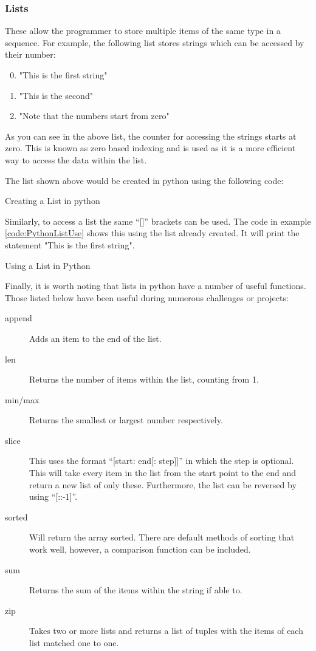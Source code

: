 			\subsubsection{Lists}
				These allow the programmer to store multiple items of the same type in a sequence.
				For example, the following list stores strings which can be accessed by their number:
				\begin{enumerate}\setcounter{enumi}{-1} %
					\item "This is the first string"
					\item "This is the second"
					\item "Note that the numbers start from zero"
				\end{enumerate}
				As you can see in the above list, the counter for accessing the strings starts at zero.
				This is known as zero based indexing and is used as it is a more efficient way to access the data within the list.

				The list shown above would be created in python using the following code:
				\begin{code}
					\centering
					\caption{Creating a List in python}
					\label{code:PythonListCreation}
				\end{code}

				Similarly, to access a list the same ``[]'' brackets can be used.
				The code in example \ref{code:PythonListUse} shows this using the list already created.
				It will print the statement "This is the first string".
				\begin{code}
					\centering
					\pcode{./PythonListUse.py}
					\caption{Using a List in Python}
					\label{code:PythonListUse}
				\end{code}

				Finally, it is worth noting that lists in python have a number of useful functions.
				Those listed below have been useful during numerous challenges or projects:
				\begin{description}
					\item[append] Adds an item to the end of the list.
					\item[len] Returns the number of items within the list, counting from 1.
					\item[min/max] Returns the smallest or largest number respectively.
					\item[slice] This uses the format ``[start: end[: step]]'' in which the step is optional.
						This will take every item in the list from the start point to the end and return a new list of only these.
						Furthermore, the list can be reversed by using ``[::-1]''.
					\item[sorted] Will return the array sorted.
						There are default methods of sorting that work well, however, a comparison function can be included.
					\item[sum] Returns the sum of the items within the string if able to.
					\item[zip] Takes two or more lists and returns a list of tuples with the items of each list matched one to one.
				\end{description}
